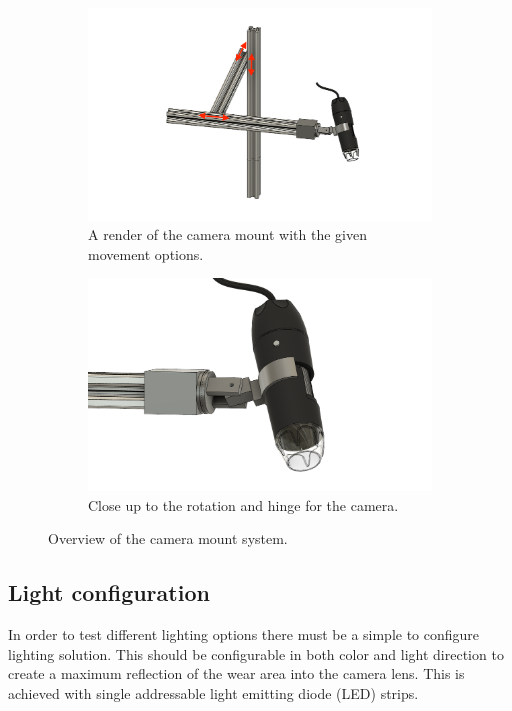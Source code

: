 		\begin{figure}[hbtp]
		\centering
		\begin{subfigure}{0.49\textwidth}
			\includegraphics[width=\linewidth]{fig/Camera_setup/camera_mount/second_camera_mount/camera mount v9 back top.png}
			\caption{A render of the camera mount with the given movement options.}
			\label{fig:impl:cs:cameramount:full}
		\end{subfigure}
		\hspace*{\fill}
		\begin{subfigure}{0.49\textwidth}
			\includegraphics[width=\linewidth]{fig/Camera_setup/camera_mount/second_camera_mount/camera mount v9 zoom camera.png}
			\caption{Close up to the rotation and hinge for the camera.}
			\label{fig:impl:cs:cameramount:zoom}
		\end{subfigure}
		\caption{Overview of the camera mount system.}
		\end{figure}
		
		
	\subsection{Light configuration}
	In order to test different lighting options there must be a simple to configure lighting solution. This should be configurable in both color and light direction to create a maximum reflection of the wear area into the camera lens. This is achieved with single addressable light emitting diode (LED) strips.
	
